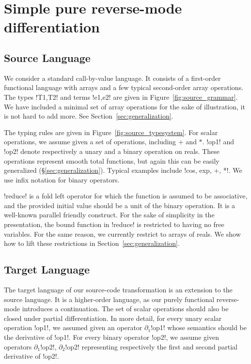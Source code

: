 \section{Simple pure reverse-mode differentiation}
\label{sec:simplediff}

\subsection{Source Language}
\label{sub:sourcelang}

\label{sub:sourcelang}

We consider a standard call-by-value language. 
It consists of a first-order functional language with arrays and a few typical second-order array operations. 
The types !T1,T2! and terms !e1,e2! are given in Figure~\ref{fig:source_grammar}.
We have included a minimal set of array operations for the sake of illustration,  it is not hard to add more.
See Section~\ref{sec:generalization}.



The typing rules are given in Figure~\ref{fig:source_typesystem}. 
For scalar operations, we assume given a set of operations, including $+$ and $*$. 
!op1! and !op2! denote respectively a unary and a binary operation on reals. 
These operations represent smooth total functions, 
but again this can be easily generalized (\S\ref{sec:generalization}).  
Typical examples include !cos, exp, +, *!. 
We use infix notation for binary operators.

!reduce! is a fold left operator for which the function is assumed to be associative, 
and the provided initial value should be a unit of the binary operation.
It is a well-known parallel friendly construct. For the sake of simplicity in the presentation, the bound function in !reduce! 
is restricted to having no free variables. For the same reason, we currently restrict to arrays of reals.
We show how to lift these restrictions in Section~\ref{sec:generalization}.



\subsection{Target Language}

The target language of our source-code transformation is an extension to the source language.
It is a higher-order language, as our purely functional reverse-mode introduces a continuation.
The set of scalar operations should also be closed under partial differentiation. 
In more detail, for every unary scalar operation !op1!, 
we assumed given an operator $\partial_1$!op1! whose semantics should be the derivative of !op1!.
For every binary operator !op2!, we assume given operators $\partial_1$!op2!, $\partial_2$!op2! 
representing respectively the first and second partial derivative of !op2!.


